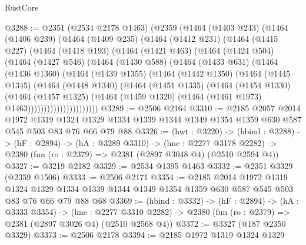 \begin{lexlean}{RustCore}
\begin{coremodule}
@3288 := @2351
    (@2534 @2178 @1463)
    (@2359
      (@1464
        (@1403 @243)
        (@1464
          (@1406 @239)
          (@1464
            (@1409 @235)
            (@1464
              (@1412 @231)
              (@1464
                (@1415 @227)
                (@1464
                  (@1418 @193)
                  (@1464
                    (@1421 @463)
                    (@1464
                      (@1424 @504)
                      (@1464
                        (@1427 @546)
                        (@1464
                          (@1430 @588)
                          (@1464
                            (@1433 @631)
                            (@1464
                              (@1436 @1360)
                              (@1464
                                (@1439 @1355)
                                (@1464
                                  (@1442 @1350)
                                  (@1464
                                    (@1445 @1345)
                                    (@1464
                                      (@1448 @1340)
                                      (@1464
                                        (@1451 @1335)
                                        (@1464
                                          (@1454 @1330)
                                          (@1464
                                            (@1457 @1325)
                                            (@1464
                                              (@1459 @1320)
                                              (@1464 (@1461 @1973) @1463))))))))))))))))))))))
@3289 := @2506 @2164
@3310 := @2185
    @2057
    @2014
    @1972
    @1319
    @1324
    @1329
    @1334
    @1339
    @1344
    @1349
    @1354
    @1359
    @630
    @587
    @545
    @503
    @83
    @76
    @66
    @79
    @88
@3326 := (hwt : @3220) ->
  (hbind : @3288) ->
  (hF : @2894) ->
  (hA : @3289 @3310) ->
  (hne : @2277 @3178 @2282) -> @2380 (fun (ro : @2379) => @2381 (@2897 @3048 @4) (@2510 @2594 @4))
@3327 := @3219 @2182
@3329 := @2534 @1395 @1463
@3332 := @2351 @3329 (@2359 @1506)
@3333 := @2506 @2171
@3354 := @2185
    @2014
    @1972
    @1319
    @1324
    @1329
    @1334
    @1339
    @1344
    @1349
    @1354
    @1359
    @630
    @587
    @545
    @503
    @83
    @76
    @66
    @79
    @88
    @68
@3369 := (hbind : @3332) ->
  (hF : @2894) ->
  (hA : @3333 @3354) ->
  (hne : @2277 @3310 @2282) -> @2380 (fun (ro : @2379) => @2381 (@2897 @3026 @4) (@2510 @2568 @4))
@3372 := @3327 (@187 @2350 @3329)
@3373 := @2506 @2178
@3394 := @2185
    @1972
    @1319
    @1324
    @1329

\end{coremodule}
\end{lexlean}
